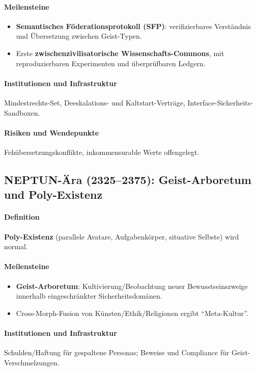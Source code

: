 \documentclass[11pt]{article}
\begin{document}
\paragraph{Meilensteine}
\begin{itemize}[noitemsep]
  \item \textbf{Semantisches Föderationsprotokoll (SFP)}: verifizierbares Verständnis und Übersetzung zwischen Geist-Typen.
  \item Erste \textbf{zwischenzivilisatorische Wissenschafts-Commons}, mit reproduzierbaren Experimenten und überprüfbaren Ledgern.
\end{itemize}

\paragraph{Institutionen und Infrastruktur} Mindestrechts-Set, Deeskalations- und Kaltstart-Verträge, Interface-Sicherheits-Sandboxen.

\paragraph{Risiken und Wendepunkte} Fehübersetzungskonflikte, inkommensurable Werte offengelegt.

\subsection{NEPTUN-Ära (2325–2375): Geist-Arboretum und Poly-Existenz}
\paragraph{Definition} \textbf{Poly-Existenz} (parallele Avatare, Aufgabenkörper, situative Selbste) wird normal.

\paragraph{Meilensteine}
\begin{itemize}[noitemsep]
  \item \textbf{Geist-Arboretum}: Kultivierung/Beobachtung neuer Bewusstseinszweige innerhalb eingeschränkter Sicherheitsdomänen.
  \item Cross-Morph-Fusion von Künsten/Ethik/Religionen ergibt ``Meta-Kultur''.
\end{itemize}

\paragraph{Institutionen und Infrastruktur} Schulden/Haftung für gespaltene Personas; Beweise und Compliance für Geist-Verschmelzungen.
\end{document}
